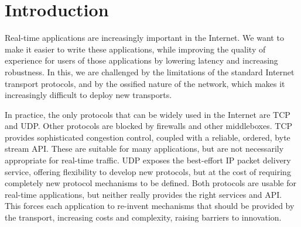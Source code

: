 \documentclass{sig-alternate-05-2015}
\begin{document}

\printccsdesc

\section{Introduction}

%

Real-time applications are increasingly important in the Internet. 
We want to make it easier to write these applications, while improving
the quality of experience for users of those applications by lowering
latency and increasing robustness. 
In this, we are challenged by the limitations of the standard Internet 
transport protocols, and by the ossified nature of the network, which makes
it increasingly difficult to deploy new transports. 


In practice, the only protocols that can be widely used in the Internet are
TCP and UDP. Other protocols are blocked by firewalls and other middleboxes.  
TCP provides sophisticated congestion control, coupled with a reliable,
ordered, byte stream API. These are suitable for many applications, but are
not necessarily appropriate for real-time traffic.  UDP exposes the best-effort 
IP packet delivery service, offering flexibility to develop new protocols,
but at the cost of requiring completely new protocol mechanisms to be
defined. Both protocols are usable for real-time applications, but neither
really provides the right services and API.  This forces each application
to re-invent mechanisms that should be provided by the transport, increasing 
costs and complexity, raising barriers to innovation.
\end{document}
